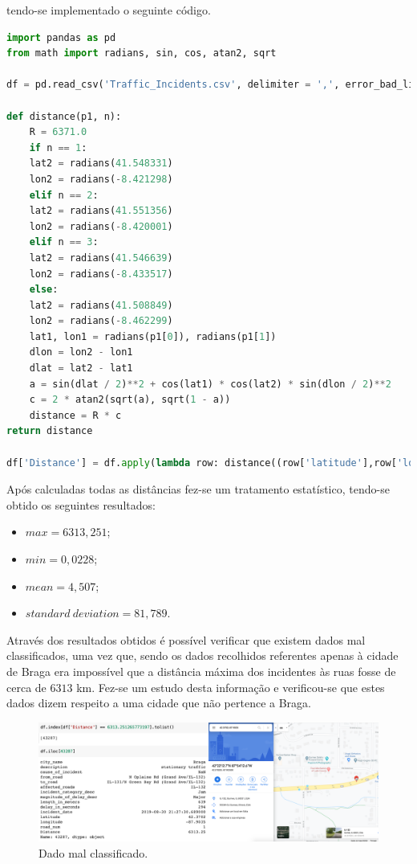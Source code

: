 \documentclass[a4paper, 12pt]{article}
\begin{document}
tendo-se implementado o seguinte código.

\begin{lstlisting}[language=Python]
import pandas as pd
from math import radians, sin, cos, atan2, sqrt

df = pd.read_csv('Traffic_Incidents.csv', delimiter = ',', error_bad_lines = False, encoding = 'ISO-8859-1')

def distance(p1, n):
	R = 6371.0
	if n == 1:
	lat2 = radians(41.548331)
	lon2 = radians(-8.421298)
	elif n == 2:
	lat2 = radians(41.551356)
	lon2 = radians(-8.420001)
	elif n == 3:
	lat2 = radians(41.546639)
	lon2 = radians(-8.433517)
	else:
	lat2 = radians(41.508849)
	lon2 = radians(-8.462299)
	lat1, lon1 = radians(p1[0]), radians(p1[1])
	dlon = lon2 - lon1
	dlat = lat2 - lat1
	a = sin(dlat / 2)**2 + cos(lat1) * cos(lat2) * sin(dlon / 2)**2
	c = 2 * atan2(sqrt(a), sqrt(1 - a))
	distance = R * c
return distance

df['Distance'] = df.apply(lambda row: distance((row['latitude'],row['longitude']), row['road_num']), axis=1)
\end{lstlisting}

Após calculadas todas as distâncias fez-se um tratamento estatístico, tendo-se obtido os seguintes resultados:

\begin{itemize}
	\item ${max}= 6313,251$;
	\item ${min}= 0,0228$;
	\item ${mean}= 4,507$;
	\item ${standard \ deviation}= 81,789$.
\end{itemize}

Através dos resultados obtidos é possível verificar que existem dados mal classificados, uma vez que, sendo os dados recolhidos referentes apenas à cidade de Braga era impossível que a distância máxima dos incidentes às ruas fosse de cerca de $6313$ km. Fez-se um estudo desta informação e verificou-se que estes dados dizem respeito a uma cidade que não pertence a Braga.

\begin{figure}[H]
	\centering
	\includegraphics[width=14cm]{EUA}
	\caption{Dado mal classificado.}
\end{figure}
\end{document}
